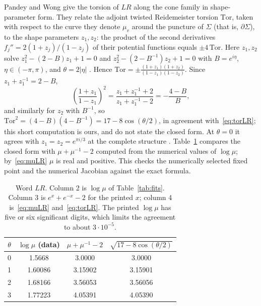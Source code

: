 \documentclass[11pt]{amsart}
\theoremstyle{definition}
\theoremstyle{remark}
\begin{document}
Pandey and Wong \cite[Prop.~4.4 and its proof]{PW} give the torsion of $LR$ along the
cone family in shape-parameter form. They relate the adjoint twisted Reidemeister
torsion $\mathrm{Tor}$, taken with respect to the curve they denote $\mu_v$ around
the puncture of $\Sigma$ (that is, $\partial\Sigma$), to the shape parameters
$z_1, z_2$: the product of the second derivatives $f_j'' = 2(1+z_j)/(1-z_j)$
\cite[(4.12), (4.13)]{PW} of their potential functions equals $\pm 4\,\mathrm{Tor}$.
Here $z_1, z_2$ solve $z_1^2 - (2-B)z_1 + 1 = 0$ and $z_2^2 - (2-B^{-1})z_2 + 1 = 0$
with $B = e^{i\eta}$, $\eta \in (-\pi, \pi)$, and $\theta = 2|\eta|$ \cite[(4.6),
(4.7), Lemma~4.1]{PW}. Hence $\mathrm{Tor} = \pm
\frac{(1+z_1)(1+z_2)}{(1-z_1)(1-z_2)}$. Since $z_1 + z_1^{-1} = 2 - B$,
\[
\left(\frac{1+z_1}{1-z_1}\right)^2 = \frac{z_1+z_1^{-1}+2}{z_1+z_1^{-1}-2} = -\frac{4-B}{B},
\]
and similarly for $z_2$ with $B^{-1}$, so
$\mathrm{Tor}^2 = (4-B)(4-B^{-1}) = 17 - 8\cos(\theta/2)$, in agreement
with~\eqref{eq:torLR}; this short computation is ours, and \cite{PW} do not state the
closed form. At $\theta = 0$ it agrees with
$z_1 = z_2 = e^{\pi i/3}$ at the complete structure \cite[Section~4.1]{PW}.
Table~\ref{tab:torsion} compares the closed form with $\mu + \mu^{-1} - 2$ computed
from the numerical values of $\log\mu$; by~\eqref{eq:muLR} $\mu$ is real and
positive. This checks the numerically selected fixed point and the numerical
Jacobian against the exact formula.

\begin{table}[ht]
\centering
\begin{tabular}{cccc}
\toprule
$\theta$ & $\log\mu$ (data) & $\mu + \mu^{-1} - 2$ & $\sqrt{17 - 8\cos(\theta/2)}$ \\
\midrule
0 & 1.5668  & 3.0000 & 3.0000 \\
1 & 1.60086 & 3.15902 & 3.15901 \\
2 & 1.68166 & 3.56053 & 3.56056 \\
3 & 1.77223 & 4.05391 & 4.05390 \\
\bottomrule
\end{tabular}
\caption{Word $LR$. Column 2 is $\log\mu$ of Table~\ref{tab:fits}. Column 3 is
$e^{x} + e^{-x} - 2$ for the printed $x$; column 4 is~\eqref{eq:muLR}
and~\eqref{eq:torLR}. The printed $\log\mu$ has five or six significant digits,
which limits the agreement to about $3\cdot 10^{-5}$.}
\label{tab:torsion}
\end{table}
\end{document}
